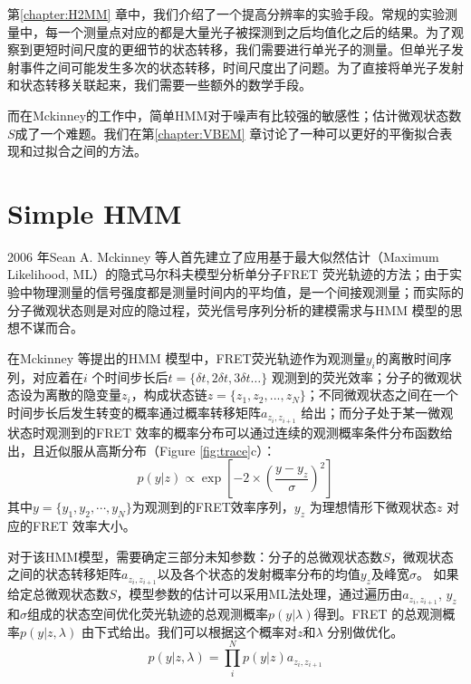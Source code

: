 \documentclass[11pt, a4paper]{article}
\begin{document}
第\ref{chapter:H2MM} 章中，我们介绍了一个提高分辨率的实验手段。常规的实验测量中，每一个测量点对应的都是大量光子被探测到之后均值化之后的结果。为了观察到更短时间尺度的更细节的状态转移，我们需要进行单光子的测量。但单光子发射事件之间可能发生多次的状态转移，时间尺度出了问题。为了直接将单光子发射和状态转移关联起来，我们需要一些额外的数学手段。

而在Mckinney的工作中，简单HMM对于噪声有比较强的敏感性；估计微观状态数$S$成了一个难题。我们在第\ref{chapter:VBEM} 章讨论了一种可以更好的平衡拟合表现和过拟合之间的方法。


\section{Simple HMM}\label{chapter:HMM}

2006 年Sean A. Mckinney 等人首先建立了应用基于最大似然估计（Maximum Likelihood, ML）的隐式马尔科夫模型分析单分子FRET 荧光轨迹的方法\cite{HMM}；由于实验中物理测量的信号强度都是测量时间内的平均值，是一个间接观测量；而实际的分子微观状态则是对应的隐过程，荧光信号序列分析的建模需求与HMM 模型的思想不谋而合。

在Mckinney 等提出的HMM 模型中，FRET荧光轨迹作为观测量$y_i$的离散时间序列，对应着在$i$ 个时间步长后$t=\{\delta t,2\delta t,3\delta t…\}$ 观测到的荧光效率；分子的微观状态设为离散的隐变量$z_i$，构成状态链$z=\{z_1,z_2,...,z_N\}$；不同微观状态之间在一个时间步长后发生转变的概率通过概率转移矩阵$a_{z_{i}, z_{i+1}}$ 给出；而分子处于某一微观状态时观测到的FRET 效率的概率分布可以通过连续的观测概率条件分布函数给出，且近似服从高斯分布（Figure \ref{fig:trace}c）：
\begin{equation}
p(y|z) \propto \exp\left[-2\times\left(\frac{y- y_z}{\sigma}\right)^2\right]
\end{equation}
其中$y=\{y_1, y_2,\cdots, y_N\}$为观测到的FRET效率序列，$y_{z}$ 为理想情形下微观状态$z$ 对应的FRET 效率大小。

对于该HMM模型，需要确定三部分未知参数：分子的总微观状态数$S$，微观状态之间的状态转移矩阵$a_{z_i, z_{i+1}}$以及各个状态的发射概率分布的均值$y_{z}$及峰宽$\sigma$。 如果给定总微观状态数$S$，模型参数的估计可以采用ML法处理，通过遍历由$a_{z_{i}, z_{i+1}}$, $y_{z} $和$\sigma$组成的状态空间优化荧光轨迹的总观测概率$p(y| \lambda)$得到。FRET 的总观测概率$p(y|z,\lambda)$ 由下式给出。我们可以根据这个概率对$z$和$\lambda$ 分别做优化。
\begin{equation}
p(y|z,\lambda)= \prod_i^N p(y|z) a_{z_{i}, z_{i+1}}
\end{equation}
\end{document}
